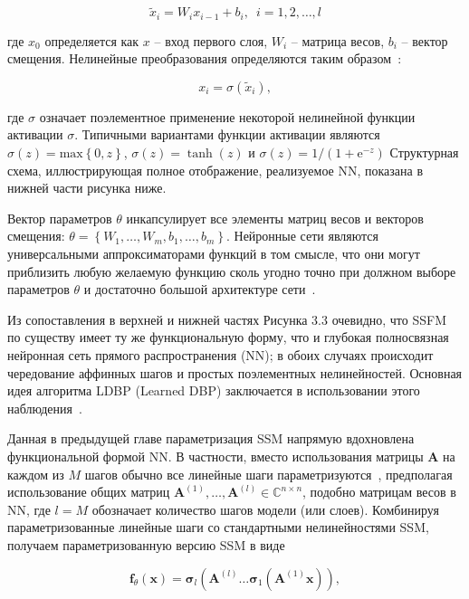 \begin{equation}
	\widetilde{x}_i = W_i x_{i-1} + b_i, \,\,\, i=1, 2, \ldots, l
\end{equation}

где $x_0$ определяется как $x$ -- вход первого слоя, $W_i$ -- матрица весов, $b_i$ -- вектор смещения.
Нелинейные преобразования определяются таким образом~\cite{goodfellow2016deep}:

\begin{equation}
	x_i = \sigma(\widetilde{x}_i),
\end{equation}

где $\sigma$ означает поэлементное применение некоторой нелинейной функции активации $\sigma$.
Типичными вариантами функции активации являются~\cite{goodfellow2016deep} $\sigma(z) = \text{max} \left\{ 0, z \right\}$, $\sigma(z) = \tanh(z)$ и $\sigma(z) = 1 / (1 + \text{e}^{-z})$
Структурная схема, иллюстрирующая полное отображение, реализуемое NN, показана в нижней части рисунка ниже.

Вектор параметров $\theta$ инкапсулирует все элементы матриц весов и векторов смещения: $\theta = \left\{ W_1, \ldots, W_m, b_1, \ldots, b_m \right\}$.
Нейронные сети являются универсальными аппроксиматорами функций в том смысле, что они могут приблизить любую желаемую функцию сколь угодно точно при должном выборе параметров $\theta$ и достаточно большой архитектуре сети~\cite{HORNIK1989359}.

Из сопоставления в верхней и нижней частях Рисунка 3.3 очевидно, что SSFM по существу имеет ту же функциональную форму, что и
глубокая полносвязная нейронная сеть прямого распространения (NN);
в обоих случаях происходит чередование аффинных шагов и простых поэлементных нелинейностей.
Основная идея алгоритма LDBP (Learned DBP) заключается в использовании этого наблюдения~\cite{Raissi2019}.

Данная в предыдущей главе параметризация SSM напрямую вдохновлена функциональной формой NN.
В частности, вместо использования матрицы $\mathbf{A}$ на каждом из $M$ шагов обычно все линейные шаги параметризуются~\cite{hager2020},
предполагая использование общих матриц $\mathbf{A}^{(1)}, \dots, \mathbf{A}^{(l)} \in \mathbb{C}^{n \times n}$, подобно матрицам весов в NN,
где $l = M$ обозначает количество шагов модели (или слоев).
Комбинируя параметризованные линейные шаги со стандартными нелинейностями SSM, получаем параметризованную версию SSM в виде

\begin{equation}
	\mathbf{f}_{\theta}(\mathbf{x}) = \mathbf{\sigma}_l(\mathbf{A}^{(l)}\ldots\mathbf{\sigma}_1(\mathbf{A}^{(1)}\mathbf{x})),
\end{equation}

